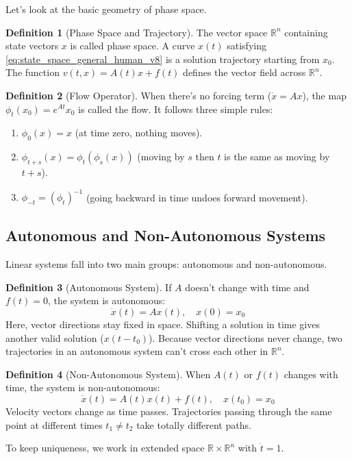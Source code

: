 \documentclass[12pt,a4paper,oneside]{article}
\theoremstyle{definition}
\newtheorem{definition}{Definition}[section]
\theoremstyle{plain}
\begin{document}
\vspace{0.2cm}
Let's look at the basic geometry of phase space.

\begin{definition}[Phase Space and Trajectory]
The vector space $\mathbb{R}^n$ containing state vectors $x$ is called phase space. A curve $x(t)$ satisfying \eqref{eq:state_space_general_human_v8} is a solution trajectory starting from $x_0$. The function $v(t, x) = A(t)x + f(t)$ defines the vector field across $\mathbb{R}^n$.
\end{definition}

\medskip
\begin{definition}[Flow Operator]
When there's no forcing term ($\dot{x} = Ax$), the map $\phi_t(x_0) = e^{At} x_0$ is called the flow. It follows three simple rules:
\begin{enumerate}[label=(\alph*)]
    \item $\phi_0(x) = x$ (at time zero, nothing moves).
    \item $\phi_{t+s}(x) = \phi_t(\phi_s(x))$ (moving by $s$ then $t$ is the same as moving by $t+s$).
    \item $\phi_{-t} = (\phi_t)^{-1}$ (going backward in time undoes forward movement).
\end{enumerate}
\end{definition}

\subsection{Autonomous and Non-Autonomous Systems}

\vspace{0.15cm}
Linear systems fall into two main groups: autonomous and non-autonomous.

\smallskip
\begin{definition}[Autonomous System]
If $A$ doesn't change with time and $f(t) = 0$, the system is autonomous:
\begin{equation}
    \dot{x}(t) = A x(t), \quad x(0) = x_0
    \label{eq:autonomous_def_human_v8}
\end{equation}
Here, vector directions stay fixed in space. Shifting a solution in time gives another valid solution ($x(t - t_0)$). Because vector directions never change, two trajectories in an autonomous system can't cross each other in $\mathbb{R}^n$.
\end{definition}

\vspace{0.2cm}
\begin{definition}[Non-Autonomous System]
When $A(t)$ or $f(t)$ changes with time, the system is non-autonomous:
\begin{equation}
    \dot{x}(t) = A(t) x(t) + f(t), \quad x(t_0) = x_0
    \label{eq:nonautonomous_def_human_v8}
\end{equation}
Velocity vectors change as time passes. Trajectories passing through the same point at different times $t_1 \neq t_2$ take totally different paths.

To keep uniqueness, we work in extended space $\mathbb{R} \times \mathbb{R}^n$ with $\dot{t} = 1$.
\end{definition}
\end{document}
